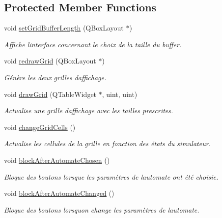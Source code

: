 \subsection*{Protected Member Functions}
\begin{DoxyCompactItemize}
\item 
void \mbox{\hyperlink{class_interface1_d_ac4e37f73f171f053a9eccb9c6cc60481}{set\+Grid\+Buffer\+Length}} (Q\+Box\+Layout $\ast$)
\begin{DoxyCompactList}\small\item\em Affiche l\textquotesingle{}interface concernant le choix de la taille du buffer. \end{DoxyCompactList}\item 
void \mbox{\hyperlink{class_interface1_d_aec2151a4097181448aaf9281ddec576e}{redraw\+Grid}} (Q\+Box\+Layout $\ast$)
\begin{DoxyCompactList}\small\item\em Génère les deux grilles d\textquotesingle{}affichage. \end{DoxyCompactList}\item 
void \mbox{\hyperlink{class_interface1_d_a3b1bb8608a015f321804762ee684c76c}{draw\+Grid}} (Q\+Table\+Widget $\ast$, uint, uint)
\begin{DoxyCompactList}\small\item\em Actualise une grille d\textquotesingle{}affichage avec les tailles prescrites. \end{DoxyCompactList}\item 
void \mbox{\hyperlink{class_interface1_d_a1f9cecc4a8c0dbfab493ceb01bb27717}{change\+Grid\+Cells}} ()
\begin{DoxyCompactList}\small\item\em Actualise les cellules de la grille en fonction des états du simulateur. \end{DoxyCompactList}\item 
void \mbox{\hyperlink{class_interface1_d_a99c01732178e56bfbac46b70d22f710c}{block\+After\+Automate\+Chosen}} ()
\begin{DoxyCompactList}\small\item\em Bloque des boutons lorsque les paramètres de l\textquotesingle{}automate ont été choisie. \end{DoxyCompactList}\item 
void \mbox{\hyperlink{class_interface1_d_a24cf627d76f7e315b78ae79570cbbbef}{block\+After\+Automate\+Changed}} ()
\begin{DoxyCompactList}\small\item\em Bloque des boutons lorsqu\textquotesingle{}on change les paramètres de l\textquotesingle{}automate. \end{DoxyCompactList}\end{DoxyCompactItemize}
